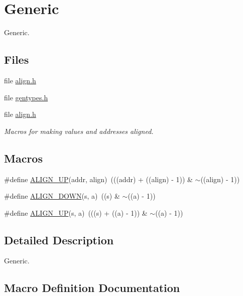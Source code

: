 \hypertarget{group__RTEMSBSPsSPARC64Generic}{}\section{Generic}
\label{group__RTEMSBSPsSPARC64Generic}


Generic.  


\subsection*{Files}
\begin{DoxyCompactItemize}
\item 
file \mbox{\hyperlink{boot_2align_8h}{align.\+h}}
\item 
file \mbox{\hyperlink{gentypes_8h}{gentypes.\+h}}
\item 
file \mbox{\hyperlink{kernel_2align_8h}{align.\+h}}
\begin{DoxyCompactList}\small\item\em Macros for making values and addresses aligned. \end{DoxyCompactList}\end{DoxyCompactItemize}
\subsection*{Macros}
\begin{DoxyCompactItemize}
\item 
\#define \mbox{\hyperlink{group__RTEMSBSPsSPARC64Generic_ga054a31fdd0f774264f62825666d21a56}{A\+L\+I\+G\+N\+\_\+\+UP}}(addr,  align)~(((addr) + ((align) -\/ 1)) \& $\sim$((align) -\/ 1))
\item 
\#define \mbox{\hyperlink{group__RTEMSBSPsSPARC64Generic_ga2a0b18c9bee8b755254e38a27031c697}{A\+L\+I\+G\+N\+\_\+\+D\+O\+WN}}(s,  a)~((s) \& $\sim$((a) -\/ 1))
\item 
\#define \mbox{\hyperlink{group__RTEMSBSPsSPARC64Generic_ga34895a33bbadda8ae8312de47dc822d2}{A\+L\+I\+G\+N\+\_\+\+UP}}(s,  a)~(((s) + ((a) -\/ 1)) \& $\sim$((a) -\/ 1))
\end{DoxyCompactItemize}


\subsection{Detailed Description}
Generic. 



\subsection{Macro Definition Documentation}
\mbox{\label{group__RTEMSBSPsSPARC64Generic_ga2a0b18c9bee8b755254e38a27031c697}} 
